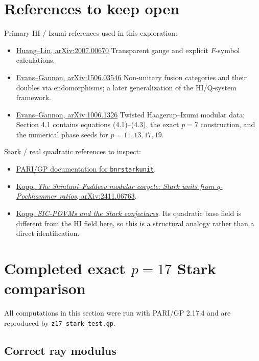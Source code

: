 \documentclass[11pt,reqno]{amsart}
\theoremstyle{plain}
\begin{document}
\section{References to keep open}\label{sec:20}

Primary HI / Izumi references used in this exploration:

\begin{itemize}
\item \href{https://arxiv.org/abs/2007.00670}{Huang--Lin, arXiv:2007.00670}
Transparent gauge and explicit \(F\)-symbol calculations.
\item \href{https://arxiv.org/abs/1506.03546}{Evans--Gannon, arXiv:1506.03546}
Non-unitary fusion categories and their doubles via endomorphisms; a later generalization of the HI/Q-system framework.
\item \href{https://arxiv.org/abs/1006.1326}{Evans--Gannon, arXiv:1006.1326}
Twisted Haagerup--Izumi modular data; Section 4.1 contains equations (4.1)--(4.3), the exact \(p=7\) construction, and the numerical phase seeds for \(p=11,13,17,19\).
\end{itemize}

Stark / real quadratic references to inspect:

\begin{itemize}
\item \href{https://pari.math.u-bordeaux.fr/dochtml/html-stable/General_number_fields.html\#bnrstarkunit}{PARI/GP documentation for \texttt{bnrstarkunit}}.
\item \href{https://arxiv.org/abs/2411.06763}{Kopp, \emph{The Shintani--Faddeev modular cocycle: Stark units from q-Pochhammer ratios}, arXiv:2411.06763}.
\item \href{https://doi.org/10.1093/imrn/rnz153}{Kopp, \emph{SIC-POVMs and the Stark conjectures}}. Its quadratic base field is different from the HI field here, so this is a structural analogy rather than a direct identification.
\end{itemize}

\section{\texorpdfstring{Completed exact \(p=17\) Stark comparison}{Completed exact p=17 Stark comparison}}\label{sec:21}

All computations in this section were run with PARI/GP 2.17.4 and are reproduced by \texttt{z17\_\allowbreak stark\_\allowbreak test.gp}.

\subsection{Correct ray modulus}\label{sec:21.1}
\end{document}
